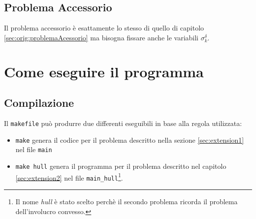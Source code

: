 \documentclass{scrartcl}
\begin{document}
\subsection{Problema Accessorio}

Il problema accessorio è esattamente lo stesso di quello di capitolo \ref{sec:orig:problemaAcessorio} ma bisogna fissare anche le variabili $\sigma_k^\delta$.

\section{Come eseguire il programma}
\subsection{Compilazione}
Il \verb|makefile| può produrre due differenti eseguibili in base alla regola utilizzata:
\begin{itemize}
	\item \verb|make| genera il codice per il problema descritto nella sezione \ref{sec:extension1} nel file \verb|main|
	\item \verb|make hull| genera il programma per il problema descritto nel capitolo \ref{sec:extension2} nel file \verb|main_hull|\footnote{Il nome \emph{hull} è stato scelto perchè il secondo problema ricorda il problema dell'involucro convesso.}.
\end{itemize}
\end{document}
